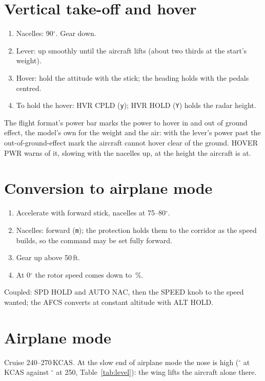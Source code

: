 \documentclass[11pt,a4paper,oneside]{book}
\newcommand{\key}[1]{\texttt{#1}}
\newcommand{\ann}[1]{\textsf{#1}}
\begin{document}
\section{Vertical take-off and hover}
\begin{enumerate}
\item Nacelles: 90$^\circ$. Gear down.
\item Lever: up smoothly until the aircraft lifts (about two thirds at the start's weight).
\item Hover: hold the attitude with the stick; the heading holds with the pedals centred.
\item To hold the hover: HVR CPLD (\key{y}); HVR HOLD (\key{Y}) holds the radar height.
\end{enumerate}
\begin{note}
The flight format's power bar marks the power to hover in and out of ground effect, the model's own for the weight
and the air: with the lever's power past the out-of-ground-effect mark the aircraft cannot hover clear of the ground.
\ann{HOVER PWR} warns of it, slowing with the nacelles up, at the height the aircraft is at.
\end{note}

\section{Conversion to airplane mode}
\begin{enumerate}
\item Accelerate with forward stick, nacelles at 75--80$^\circ$.
\item Nacelles: forward (\key{m}); the protection holds them to the corridor as the speed builds, so the command may be
set fully forward.
\item Gear up above 50\,ft.
\item At 0$^\circ$ the rotor speed comes down to \MNrApln\,\%.
\end{enumerate}
Coupled: SPD HOLD and AUTO NAC, then the SPEED knob to the speed wanted; the AFCS converts at constant altitude with ALT
HOLD.

\section{Airplane mode}
Cruise 240--270\,KCAS. At the slow end of airplane mode the nose is high (\MPitchApln$^\circ$ at \MPitchAplnKcas\,KCAS against
\MPitchTwoFifty$^\circ$ at 250, Table~\ref{tab:level}): the wing lifts the aircraft alone there.
\end{document}

